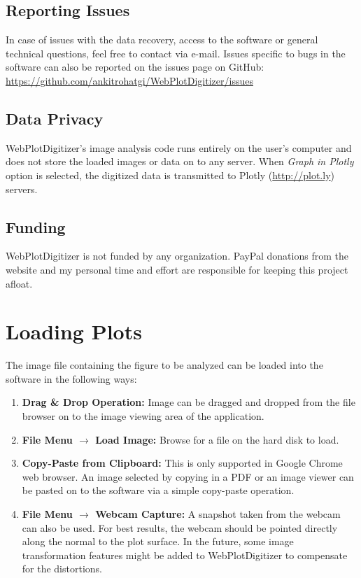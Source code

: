 \documentclass[letterpaper, 10pt]{article}
\begin{document}
\subsection{Reporting Issues}
In case of issues with the data recovery, access to the software or general technical questions, feel free to contact via e-mail. Issues specific to bugs in the software can also be reported on the issues page on GitHub: \url{https://github.com/ankitrohatgi/WebPlotDigitizer/issues}

\subsection{Data Privacy}
WebPlotDigitizer's image analysis code runs entirely on the user's computer and does not store the loaded images or data on to any server. When \emph{Graph in Plotly} option is selected, the digitized data is transmitted to Plotly (\url{http://plot.ly}) servers.

\subsection{Funding}
WebPlotDigitizer is not funded by any organization. PayPal donations from the website and my personal time and effort are responsible for keeping this project afloat.

\section{Loading Plots}
The image file containing the figure to be analyzed can be loaded into the software in the following ways:
\begin{enumerate}
\item{{\bf Drag \& Drop Operation:} Image can be dragged and dropped from the file browser on to the image viewing area of the application.}
\item{{\bf File Menu $\rightarrow$ Load Image:} Browse for a file on the hard disk to load.}
\item{{\bf Copy-Paste from Clipboard:} This is only supported in Google Chrome web browser. An image selected by copying in a PDF or an image viewer can be pasted on to the software via a simple copy-paste operation.}
\item{{\bf File Menu $\rightarrow$ Webcam Capture:} A snapshot taken from the webcam can also be used. For best results, the webcam should be pointed directly along the normal to the plot surface. In the future, some image transformation features might be added to WebPlotDigitizer to compensate for the distortions.}  
\end{enumerate}
\end{document}
